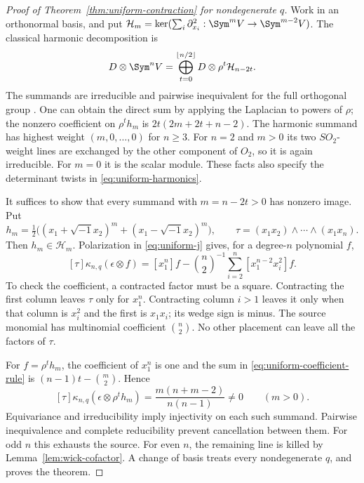 \begin{proof}[Proof of Theorem~\ref{thm:uniform-contraction} for nondegenerate \(q\)]
Work in an orthonormal basis, and put
\(\mathcal H_m=\ker(\sum_i\partial_{x_i}^2:\Sym^mV\to\Sym^{m-2}V)\).
The classical harmonic decomposition is
\begin{equation}\label{eq:uniform-harmonics}
 D\otimes\Sym^nV=
   \bigoplus_{t=0}^{\lfloor n/2\rfloor}D\otimes\rho^t\mathcal H_{n-2t}.
\end{equation}
The summands are irreducible and pairwise inequivalent for the full
orthogonal group \cite{FultonHarris}.  One can obtain the direct sum
by applying the Laplacian to powers of \(\rho\); the nonzero
coefficient on \(\rho^th_m\) is
\(2t(2m+2t+n-2)\).  The harmonic summand has highest weight
\((m,0,\ldots,0)\) for \(n\ge3\).  For \(n=2\) and \(m>0\)
its two \(SO_2\)-weight lines are exchanged by the other component
of \(O_2\), so it is again irreducible.  For \(m=0\) it is the
scalar module.  These facts also specify the determinant twists in
\eqref{eq:uniform-harmonics}.

It suffices to show that every summand with \(m=n-2t>0\) has
nonzero image.  Put
\[
 h_m=\tfrac12\bigl((x_1+\sqrt{-1}x_2)^m+
                         (x_1-\sqrt{-1}x_2)^m\bigr),\qquad
 \tau=(x_1x_2)\wedge\cdots\wedge(x_1x_n).
\]
Then \(h_m\in\mathcal H_m\).  Polarization in
\eqref{eq:uniform-j} gives, for a degree-\(n\) polynomial \(f\),
\begin{equation}\label{eq:uniform-coefficient-rule}
 [\tau]\kappa_{n,q}(\epsilon\otimes f)=
 [x_1^n]f-\binom n2^{-1}\sum_{i=2}^n[x_1^{n-2}x_i^2]f.
\end{equation}
To check the coefficient, a contracted factor must be a square.
Contracting the first column leaves \(\tau\) only for \(x_1^n\).
Contracting column \(i>1\) leaves it only when that column is
\(x_i^2\) and the first is \(x_1x_i\); its wedge sign is minus.
The source monomial has multinomial coefficient \(\binom n2\).
No other placement can leave all the factors of \(\tau\).

For \(f=\rho^t h_m\), the coefficient of \(x_1^n\) is one
and the sum in \eqref{eq:uniform-coefficient-rule} is
\((n-1)t-\binom m2\).  Hence
\begin{equation}\label{eq:uniform-harmonic-nonzero}
 [\tau]\kappa_{n,q}(\epsilon\otimes\rho^t h_m)
   =\frac{m(n+m-2)}{n(n-1)}\ne0\qquad(m>0).
\end{equation}
Equivariance and irreducibility imply injectivity on each such
summand.  Pairwise inequivalence and complete reducibility prevent
cancellation between them.  For odd \(n\) this exhausts the source.
For even \(n\), the remaining line is killed by
Lemma~\ref{lem:wick-cofactor}.  A change of basis treats every
nondegenerate \(q\), and proves the theorem.
\end{proof}

